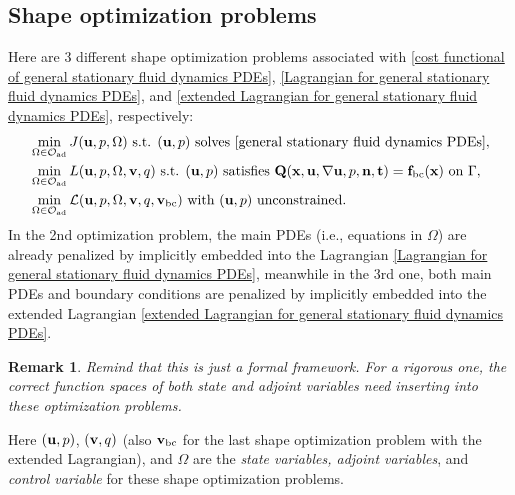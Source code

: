 \documentclass[oneside]{book}
\numberwithin{equation}{section}
\newtheorem{remark}{Remark}[section]
\begin{document}
\subsection{Shape optimization problems}
Here are 3 different shape optimization problems associated with \eqref{cost functional of general stationary fluid dynamics PDEs}, \eqref{Lagrangian for general stationary fluid dynamics PDEs}, and \eqref{extended Lagrangian for general stationary fluid dynamics PDEs}, respectively:
\begin{align*}
    &\min_{\Omega\in\mathcal{O}_{\rm ad}} J({\bf u},p,\Omega) \mbox{ s.t. } ({\bf u},p) \mbox{ solves \eqref{general stationary fluid dynamics PDEs}},\\
    &\min_{\Omega\in\mathcal{O}_{\rm ad}} L({\bf u},p,\Omega,{\bf v},q) \mbox{ s.t. } ({\bf u},p) \mbox{ satisfies } {\bf Q}({\bf x},{\bf u},\nabla{\bf u},p,{\bf n},{\bf t}) = {\bf f}_{\rm bc}({\bf x}) \mbox{ on } \Gamma,\\
    &\min_{\Omega\in\mathcal{O}_{\rm ad}} \mathcal{L}({\bf u},p,\Omega,{\bf v},q,{\bf v}_{\rm bc}) \mbox{ with } ({\bf u},p) \mbox{ unconstrained}.
\end{align*}
In the 2nd optimization problem, the main PDEs (i.e., equations in $\Omega$) are already penalized by implicitly embedded into the Lagrangian \eqref{Lagrangian for general stationary fluid dynamics PDEs}, meanwhile in the 3rd one, both main PDEs and boundary conditions are penalized by implicitly embedded into the extended Lagrangian \eqref{extended Lagrangian for general stationary fluid dynamics PDEs}.
\begin{remark}
    Remind that this is just a formal framework. For a rigorous one, the correct function spaces of both state and adjoint variables need inserting into these optimization problems.
\end{remark}
Here $({\bf u},p)$, $({\bf v},q)$ (also ${\bf v}_{\rm bc}$ for the last shape optimization problem with the extended Lagrangian), and $\Omega$ are the \textit{state variables, adjoint variables}, and \textit{control variable} for these shape optimization problems.
\end{document}

